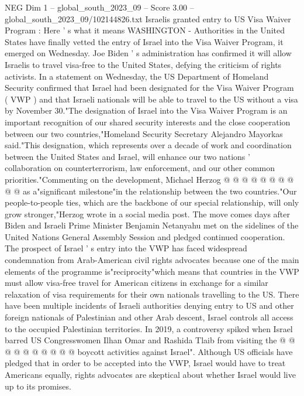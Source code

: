 \begin{textsample}{NEG Dim 1 – global\_south\_2023\_09 – Score 3.00 – global\_south\_2023\_09/102144826.txt}  \label{ex:f1_neg_003}
Israelis granted entry to US Visa Waiver Program : Here ' s what it means WASHINGTON - Authorities in the United States have finally vetted the entry of Israel into the Visa Waiver Program, it emerged on Wednesday.
Joe Biden ' s administration has confirmed it will allow Israelis to travel visa-free to the United States, defying the criticism of rights activists.
In a statement on Wednesday, the US Department of Homeland Security confirmed that Israel had been designated for the Visa Waiver Program ( VWP ) and that Israeli nationals will be able to travel to the US without a visa by November 30."The designation of Israel into the Visa Waiver Program is an important recognition of our shared security interests and the close cooperation between our two countries,"Homeland Security Secretary Alejandro Mayorkas said."This designation, which represents over a decade of work and coordination between the United States and Israel, will enhance our two nations ' collaboration on counterterrorism, law enforcement, and our other common priorities."Commenting on the development, Michael Herzog @ @ @ @ @ @ @ @ @ @ as a"significant milestone"in the relationship between the two countries."Our people-to-people ties, which are the backbone of our special relationship, will only grow stronger,"Herzog wrote in a social media post.
The move comes days after Biden and Israeli Prime Minister Benjamin Netanyahu met on the sidelines of the United Nations General Assembly Session and pledged continued cooperation.
The prospect of Israel ' s entry into the VWP has faced widespread condemnation from Arab-American civil rights advocates because one of the main elements of the programme is"reciprocity"which means that countries in the VWP must allow visa-free travel for American citizens in exchange for a similar relaxation of visa requirements for their own nationals travelling to the US.
There have been multiple incidents of Israeli authorities denying entry to US and other foreign nationals of Palestinian and other Arab descent, Israel controls all access to the occupied Palestinian territories.
In 2019, a controversy spiked when Israel barred US Congresswomen Ilhan Omar and Rashida Tlaib from visiting the @ @ @ @ @ @ @ @ @ @ boycott activities against Israel".
Although US officials have pledged that in order to be accepted into the VWP, Israel would have to treat Americans equally, rights advocates are skeptical about whether Israel would live up to its promises.

\end{textsample}
